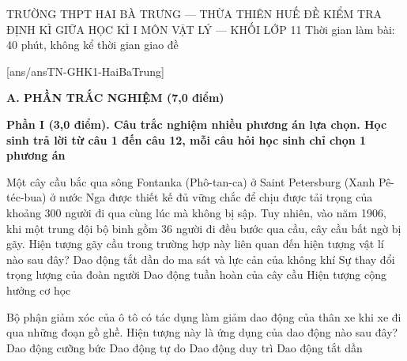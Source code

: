 \def\toanlop{11}
\def\thoigian{40}
\def\namhoc{2025 - 2026}
\begin{dethi}
	{TRƯỜNG THPT HAI BÀ TRƯNG --- THỪA THIÊN HUẾ}
	{ĐỀ KIỂM TRA ĐỊNH KÌ GIỮA HỌC KÌ I}
	{MÔN VẬT LÝ --- KHỐI LỚP 11}
	{Thời gian làm bài: 40 phút, không kể thời gian giao đề}
\end{dethi}

[ans/ansTN-GHK1-HaiBaTrung]

\noindent \textbf{A. PHẦN TRẮC NGHIỆM (7,0 điểm)}

\noindent \textbf{Phần I (3,0 điểm). Câu trắc nghiệm nhiều phương án lựa chọn. Học sinh trả lời từ câu 1 đến câu 12, mỗi câu hỏi học sinh chỉ chọn 1 phương án}
\vspace{0.2cm}

\begin{ex}%
	Một cây cầu bắc qua sông Fontanka (Phô-tan-ca) ở Saint Petersburg (Xanh Pê-téc-bua) ở nước Nga được thiết kế đủ vững chắc để chịu được tải trọng của khoảng 300 người đi qua cùng lúc mà không bị sập. Tuy nhiên, vào năm 1906, khi một trung đội bộ binh gồm 36 người đi đều bước qua cầu, cây cầu bất ngờ bị gãy. Hiện tượng gãy cầu trong trường hợp này liên quan đến hiện tượng vật lí nào sau đây?
	\choice
	{Dao động tắt dần do ma sát và lực cản của không khí}
	{Sự thay đổi trọng lượng của đoàn người}
	{Dao động tuần hoàn của cây cầu}
	{\True Hiện tượng cộng hưởng cơ học}
\end{ex}

\begin{ex}%
	Bộ phận giảm xóc của ô tô có tác dụng làm giảm dao động của thân xe khi xe đi qua những đoạn gồ ghề. Hiện tượng này là ứng dụng của dao động nào sau đây?
	\choice
	{Dao động cưỡng bức}
	{Dao động tự do}
	{Dao động duy trì}
	{\True Dao động tắt dần}
\end{ex}

